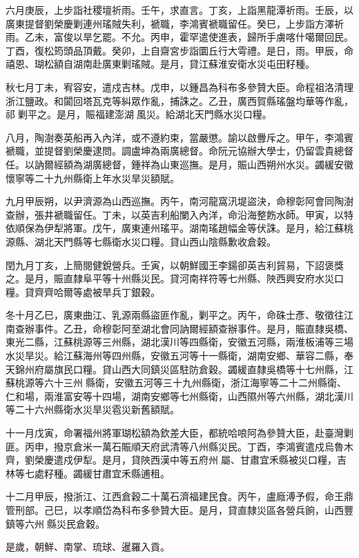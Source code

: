 \begin{pinyinscope}
六月庚辰，上步詣社稷壇祈雨。壬午，求直言。丁亥，上詣黑龍潭祈雨。壬辰，以廣東提督劉榮慶剿連州瑤賊失利，褫職，李鴻賓褫職留任。癸巳，上步詣方澤祈雨。乙未，富俊以旱乞罷。不允。丙申，霍罕遣使進表，歸所手虜喀什噶爾回民。丁酉，復松筠頭品頂戴。癸卯，上自齋宮步詣圜丘行大雩禮。是日，雨。甲辰，命禧恩、瑚松額自湖南赴廣東剿瑤賊。是月，貸江蘇淮安衛水災屯田籽種。

秋七月丁未，宥容安，遣戍吉林。戊申，以鍾昌為科布多參贊大臣。命程祖洛清理浙江鹽政。和闐回塔瓦克等糾眾作亂，捕誅之。乙丑，廣西賀縣瑤盤均華等作亂，祁剿平之。是月，賑福建澎湖風災。給湖北天門縣水災口糧。

八月，陶澍奏英船再入內洋，或不遵約束，當嚴懲。諭以啟釁斥之。甲午，李鴻賓褫職，並提督劉榮慶逮問。調盧坤為兩廣總督。命阮元協辦大學士，仍留雲貴總督任。以訥爾經額為湖廣總督，鍾祥為山東巡撫。是月，賑山西朔州水災。蠲緩安徽懷寧等二十九州縣衛上年水災旱災額賦。

九月甲辰朔，以尹濟源為山西巡撫。丙午，南河龍窩汛堤盜決，命穆彰阿會同陶澍查辦，張井褫職留任。丁未，以英吉利船闌入內洋，命沿海整飭水師。甲寅，以特依順保為伊犁將軍。戊午，廣東連州瑤平。湖南瑤趙幅金等伏誅。是月，給江蘇桃源縣、湖北天門縣等七縣衛水災口糧。貸山西山陰縣歉收倉穀。

閏九月丁亥，上簡閱健銳營兵。壬寅，以朝鮮國王李鍚卻英吉利貿易，下詔褒獎之。是月，賑直隸阜平等十州縣災民。貸河南祥符等七州縣、陜西興安府水災口糧。貸齊齊哈爾等處被旱兵丁銀穀。

冬十月乙巳，廣東曲江、乳源兩縣盜匪作亂，剿平之。丙午，命硃士彥、敬徵往江南查辦事件。乙丑，命穆彰阿至湖北會同訥爾經額查辦事件。是月，賑直隸吳橋、東光二縣，江蘇桃源等三州縣，湖北漢川等四縣衛，安徽五河縣，兩淮板浦等三場水災旱災。給江蘇海州等四州縣，安徽五河等十一縣衛，湖南安鄉、華容二縣，奉天錦州府屬旗民口糧。貸山西大同鎮災區駐防倉穀。蠲緩直隸吳橋等十七州縣，江蘇桃源等六十三州縣衛，安徽五河等三十九州縣衛，浙江海寧等二十二州縣衛、仁和場，兩淮富安等十四場，湖南安鄉等七州縣衛，山西隰州等六州縣，湖北漢川等二十六州縣衛水災旱災雹災新舊額賦。

十一月戊寅，命署福州將軍瑚松額為欽差大臣，都統哈哴阿為參贊大臣，赴臺灣剿匪。丙申，撥京倉米一萬石賑順天府武清等八州縣災民。丁酉，李鴻賓遣戍烏魯木齊，劉榮慶遣戍伊犁。是月，貸陜西漢中等五府州屬、甘肅宜禾縣被災口糧，吉林等七處籽種。蠲緩甘肅宜禾縣逋租。

十二月甲辰，撥浙江、江西倉穀二十萬石濟福建民食。丙午，盧廕溥予假，命王鼎管刑部。己巳，以孝順岱為科布多參贊大臣。是月，貸直隸災區各營兵餉，山西豐鎮等六州縣災民倉穀。

是歲，朝鮮、南掌、琉球、暹羅入貢。


\end{pinyinscope}
